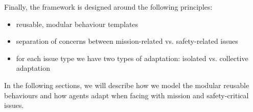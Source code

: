 \documentclass[journal]{IEEEtran}
\theoremstyle{definition}
\newtheorem{definition}{Definition}
\newcommand\darko[1]{\nb{Darko}{#1}}
\newcommand\ivano[1]{\nb{Ivano}{#1}}
\begin{document}
 
%
Finally, the framework is designed around the following principles:
\begin{itemize}
\item reusable, modular behaviour templates
\item separation of concerns between mission-related vs. safety-related issues
\item for each issue type we have two types of adaptation: isolated vs. collective adaptation 
\end{itemize}
In the following sections, 
we will describe 
how we model the modular reusable behaviours and how agents adapt 
when facing with mission and safety-critical issues.















\end{document}

